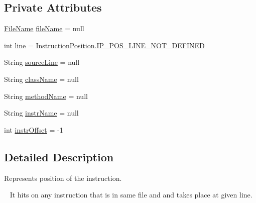 \subsection*{Private Attributes}
\begin{DoxyCompactItemize}
\item 
\hyperlink{classgov_1_1nasa_1_1jpf_1_1inspector_1_1utils_1_1expressions_1_1_file_name}{File\+Name} \hyperlink{classgov_1_1nasa_1_1jpf_1_1inspector_1_1server_1_1breakpoints_1_1_instruction_position_impl_a516c1bf9f9237fa2da514022d0ed4679}{file\+Name} = null
\item 
int \hyperlink{classgov_1_1nasa_1_1jpf_1_1inspector_1_1server_1_1breakpoints_1_1_instruction_position_impl_ab362ce71d6d351401c64199096a5a75c}{line} = \hyperlink{interfacegov_1_1nasa_1_1jpf_1_1inspector_1_1interfaces_1_1_instruction_position_af542a3a926e7a0ef8ad18bde5ee98634}{Instruction\+Position.\+I\+P\+\_\+\+P\+O\+S\+\_\+\+L\+I\+N\+E\+\_\+\+N\+O\+T\+\_\+\+D\+E\+F\+I\+N\+ED}
\item 
String \hyperlink{classgov_1_1nasa_1_1jpf_1_1inspector_1_1server_1_1breakpoints_1_1_instruction_position_impl_ae8a3786b40675ad5b90a137b828c539b}{source\+Line} = null
\item 
String \hyperlink{classgov_1_1nasa_1_1jpf_1_1inspector_1_1server_1_1breakpoints_1_1_instruction_position_impl_af1da872ffe98d641617964bdc2edc7eb}{class\+Name} = null
\item 
String \hyperlink{classgov_1_1nasa_1_1jpf_1_1inspector_1_1server_1_1breakpoints_1_1_instruction_position_impl_a3fc161c51e7150e0192f16a1b0f844d3}{method\+Name} = null
\item 
String \hyperlink{classgov_1_1nasa_1_1jpf_1_1inspector_1_1server_1_1breakpoints_1_1_instruction_position_impl_a5d2980c1de4a8894d99b806c32df5db4}{instr\+Name} = null
\item 
int \hyperlink{classgov_1_1nasa_1_1jpf_1_1inspector_1_1server_1_1breakpoints_1_1_instruction_position_impl_a73aceb15c7e4bbacc5a811701cf5482e}{instr\+Offset} = -\/1
\end{DoxyCompactItemize}


\subsection{Detailed Description}
Represents position of the instruction. 

~\newline
 It hits on any instruction that is in same file and and takes place at given line. 

